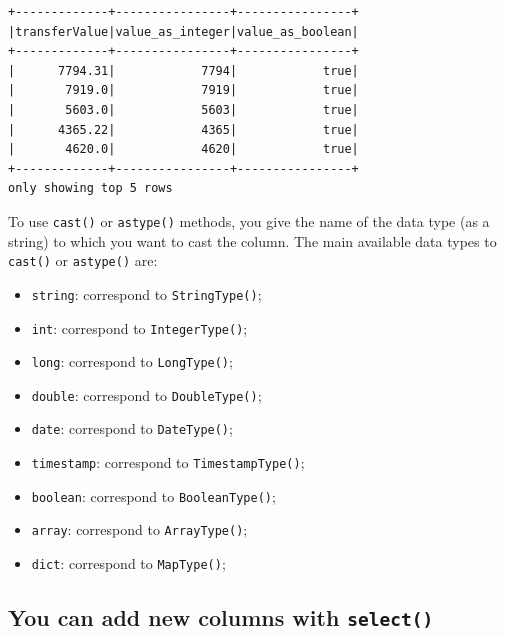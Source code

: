 \documentclass[
  11pt,
  letterpaper,
  DIV=11,
  numbers=noendperiod]{scrreprt}
\providecommand{\tightlist}{%
  \setlength{\itemsep}{0pt}\setlength{\parskip}{0pt}}\usepackage{longtable,booktabs,array}
\begin{document}
\begin{verbatim}
+-------------+----------------+----------------+
|transferValue|value_as_integer|value_as_boolean|
+-------------+----------------+----------------+
|      7794.31|            7794|            true|
|       7919.0|            7919|            true|
|       5603.0|            5603|            true|
|      4365.22|            4365|            true|
|       4620.0|            4620|            true|
+-------------+----------------+----------------+
only showing top 5 rows
\end{verbatim}

To use \texttt{cast()} or \texttt{astype()} methods, you give the name
of the data type (as a string) to which you want to cast the column. The
main available data types to \texttt{cast()} or \texttt{astype()} are:

\begin{itemize}
\tightlist
\item
  \texttt{\textquotesingle{}string\textquotesingle{}}: correspond to
  \texttt{StringType()};
\item
  \texttt{\textquotesingle{}int\textquotesingle{}}: correspond to
  \texttt{IntegerType()};
\item
  \texttt{\textquotesingle{}long\textquotesingle{}}: correspond to
  \texttt{LongType()};
\item
  \texttt{\textquotesingle{}double\textquotesingle{}}: correspond to
  \texttt{DoubleType()};
\item
  \texttt{\textquotesingle{}date\textquotesingle{}}: correspond to
  \texttt{DateType()};
\item
  \texttt{\textquotesingle{}timestamp\textquotesingle{}}: correspond to
  \texttt{TimestampType()};
\item
  \texttt{\textquotesingle{}boolean\textquotesingle{}}: correspond to
  \texttt{BooleanType()};
\item
  \texttt{\textquotesingle{}array\textquotesingle{}}: correspond to
  \texttt{ArrayType()};
\item
  \texttt{\textquotesingle{}dict\textquotesingle{}}: correspond to
  \texttt{MapType()};
\end{itemize}

\hypertarget{you-can-add-new-columns-with-select}{%
\subsection{\texorpdfstring{You can add new columns with
\texttt{select()}}{You can add new columns with select()}}\label{you-can-add-new-columns-with-select}}
\end{document}
